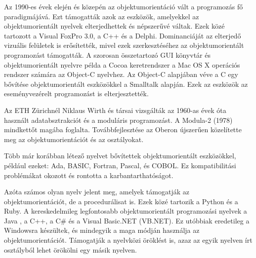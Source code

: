 \documentclass[]{thesis-ekf}
\theoremstyle{definition}
\begin{document}
	Az 1990-es évek elején és közepén az objektumorientáció vált a programozás fő paradigmájává. Ezt támogatták azok az eszközök, amelyekkel az objektumorientált nyelvek elterjedhettek és népszerűvé váltak. Ezek közé tartozott a Visual FoxPro 3.0, a C++ és a Delphi. Dominanciáját az elterjedő vizuális felületek is erősítették, mivel ezek szerkesztéséhez az objektumorientált programozást támogatták. A szorosan összetartozó GUI könyvtár és objektumorientált nyelvre példa a Cocoa keretrendszer a Mac OS X operációs rendszer számára az Object-C nyelvhez. Az Object-C alapjában véve a C egy bővítése objektumorientált eszközökkel a Smalltalk alapján. Ezek az eszközök az eseményvezérelt programozást is elterjesztették.
	
	Az ETH Zürichnél Niklaus Wirth és társai vizsgálták az 1960-as évek óta használt adatabsztrakciót és a moduláris programozást. A Modula-2 (1978) mindkettőt magába foglalta. Továbbfejlesztése az Oberon újszerűen közelítette meg az objektumorientációt és az osztályokat.
	
	Több már korábban létező nyelvet bővítettek objektumorientált eszközökkel, például ezeket: Ada, BASIC, Fortran, Pascal, és COBOL. Ez kompatibilitási problémákat okozott és rontotta a karbantarthatóságot.
	
	Azóta számos olyan nyelv jelent meg, amelyek támogatják az objektumorientációt, de a procedurálisat is. Ezek közé tartozik a Python és a Ruby. A kereskedelmileg legfontosabb objektumorientált programozási nyelvek a Java , a C++, a C\# és a Visual Basic.NET (VB.NET). Ez utóbbiak eredetileg a Windowsra készültek, és mindegyik a maga módján használja az objektumorientációt. Támogatják a nyelvközi öröklést is, azaz az egyik nyelven írt osztályból lehet örökölni egy másik nyelven.
	
\end{document}
